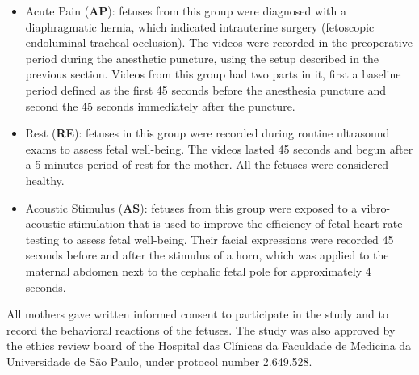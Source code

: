 \begin{itemize}
    \item Acute Pain (\textbf{AP}): fetuses from this group were diagnosed with a diaphragmatic hernia, which indicated intrauterine surgery (fetoscopic endoluminal tracheal occlusion). The videos were recorded in the preoperative period during the anesthetic puncture, using the setup described in the previous section. Videos from this group had two parts in it, first a baseline period defined as the first 45 seconds before the anesthesia puncture and second the 45 seconds immediately after the puncture. 
    
    \item Rest (\textbf{RE}): fetuses in this group were recorded during routine ultrasound exams to assess fetal well-being. The videos lasted 45 seconds and begun after a 5 minutes period of rest for the mother. All the fetuses were considered healthy.
    
    \item Acoustic Stimulus (\textbf{AS}): fetuses from this group were exposed to a vibro-acoustic stimulation that is used to improve the efficiency of fetal heart rate testing to assess fetal well-being. Their facial expressions were recorded 45 seconds before and after the stimulus of a horn, which was applied to the maternal abdomen next to the cephalic fetal pole for approximately 4 seconds.
\end{itemize}

All mothers gave written informed consent to participate in the study and to record the behavioral reactions of the fetuses. The study was also approved by the ethics review board of the Hospital das Clínicas da Faculdade de Medicina da Universidade de São Paulo, under protocol number 2.649.528.

